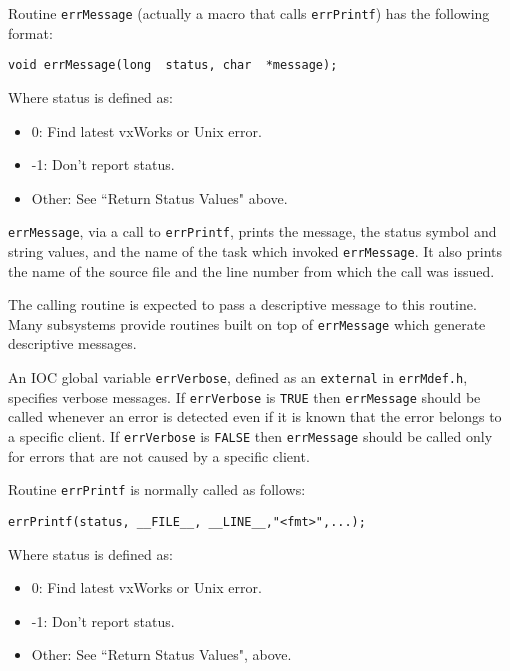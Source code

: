 Routine \verb|errMessage| (actually a macro that calls \verb|errPrintf|) has the following format:

\begin{verbatim}
void errMessage(long  status, char  *message);
\end{verbatim}

Where status is defined as:

\begin{itemize}
\item 0: Find latest vxWorks or Unix error.

\item -1: Don't report status.

\item Other: See ``Return Status Values" above.

\end{itemize}

\verb|errMessage|, via a call to \verb|errPrintf|, prints the message, the status symbol and string values, and the name of the task which invoked \verb|errMessage|.
It also prints the name of the source file and the line number from which the call was issued.

The calling routine is expected to pass a descriptive message to this routine.
Many subsystems provide routines built on top of \verb|errMessage| which generate descriptive messages.

An IOC global variable \verb|errVerbose|, defined as an \verb|external| in \verb|errMdef.h|, specifies verbose messages.
If \verb|errVerbose| is \verb|TRUE| then \verb|errMessage| should be called whenever an error is detected even if it is known that the error belongs to a specific client.
If \verb|errVerbose| is \verb|FALSE| then \verb|errMessage| should be called only for errors that are not caused by a specific client.

Routine \verb|errPrintf| is normally called as follows:

\begin{verbatim}
errPrintf(status, __FILE__, __LINE__,"<fmt>",...);
\end{verbatim}

Where status is defined as:

\begin{itemize}
\item 0: Find latest vxWorks or Unix error.

\item -1: Don't report status.

\item Other: See ``Return Status Values", above.

\end{itemize}

